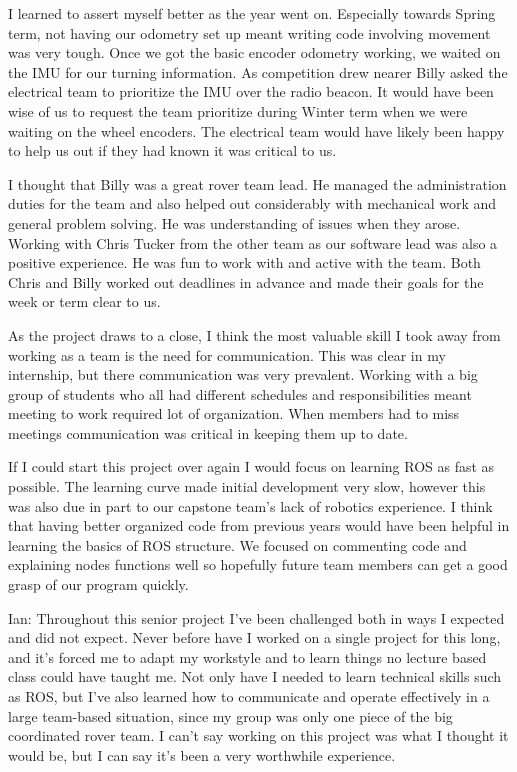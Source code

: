 \documentclass[10pt, oneside,onecolumn]{IEEEtran}
\begin{document}
\begin{titlepage}
I learned to assert myself better as the year went on. Especially towards Spring term, not having our odometry set up meant writing code involving movement was very tough. Once we got the basic encoder odometry working, we waited on the IMU for our turning information. As competition drew nearer Billy asked the electrical team to prioritize the IMU over the radio beacon. It would have been wise of us to request  the team prioritize during Winter term when we were waiting on the wheel encoders. The electrical team would have likely been happy to help us out if they had known it was critical to us. 

I thought that Billy was a great rover team lead. He managed the administration duties for the team and also helped out considerably with mechanical work and general problem solving. He was understanding of issues when they arose. Working with Chris Tucker from the other team as our software lead was also a positive experience. He was fun to work with and active with the team. Both Chris and Billy worked out deadlines in advance and made their goals for the week or term clear to us.

As the project draws to a close, I think the most valuable skill I took away from working as a team is the need for communication. This was clear in my internship, but there communication was very prevalent. Working with a big group of students who all had different schedules and responsibilities meant meeting to work required lot of organization. When members had to miss meetings communication was critical in keeping them up to date. 

If I could start this project over again I would focus on learning ROS as fast as possible. The learning curve made initial development very slow, however this was also due in part to our capstone team's lack of robotics experience. I think that having better organized code from previous years would have been helpful in learning the basics of ROS structure. We focused on commenting code and explaining nodes functions well so hopefully future team members can get a good grasp of our program quickly. 

Ian:
Throughout this senior project I’ve been challenged both in ways I expected and did not expect. Never before have I worked on a single project for this long, and it’s forced me to adapt my workstyle and to learn things no lecture based class could have taught me. Not only have I needed to learn technical skills such as ROS, but I’ve also learned how to communicate and operate effectively in a large team-based situation, since my group was only one piece of the big coordinated rover team. I can’t say working on this project was what I thought it would be, but I can say it’s been a very worthwhile experience. 


\end{titlepage}
\end{document}
